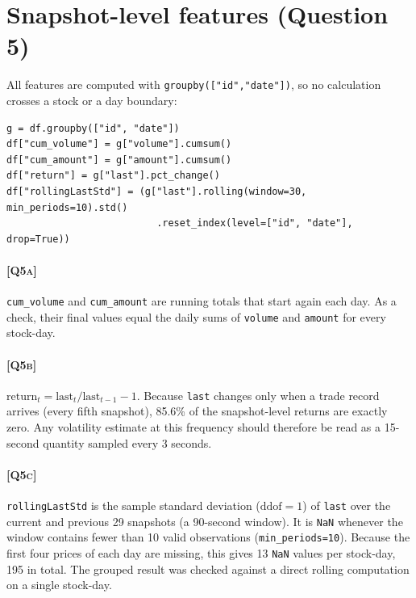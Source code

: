 \documentclass[11pt,a4paper]{article}
\newcommand{\Q}[1]{\textsc{[Q#1]}}
\newcommand{\code}[1]{\texttt{#1}}
\begin{document}
\begin{table}[H]
\centering\small
\caption{\Q{3b} Decomposition of one-sided widenings (\% of all widenings of the stock).}
\label{tab:xor}

\end{table}

\section{Snapshot-level features (Question 5)}\label{sec:features}

All features are computed with \code{groupby(["id","date"])}, so no calculation crosses a stock
or a day boundary:
\begin{lstlisting}
g = df.groupby(["id", "date"])
df["cum_volume"] = g["volume"].cumsum()
df["cum_amount"] = g["amount"].cumsum()
df["return"] = g["last"].pct_change()
df["rollingLastStd"] = (g["last"].rolling(window=30, min_periods=10).std()
                          .reset_index(level=["id", "date"], drop=True))
\end{lstlisting}

\paragraph{\Q{5a}} \code{cum\_volume} and \code{cum\_amount} are running totals that start again
each day. As a check, their final values equal the daily sums of \code{volume} and \code{amount}
for every stock-day.

\paragraph{\Q{5b}} $\text{return}_t = \text{last}_t/\text{last}_{t-1}-1$. Because \code{last}
changes only when a trade record arrives (every fifth snapshot), 85.6\% of the snapshot-level
returns are exactly zero. Any volatility estimate at this frequency should therefore be read as a
15-second quantity sampled every 3 seconds.

\paragraph{\Q{5c}} \code{rollingLastStd} is the sample standard deviation ($\text{ddof}=1$) of
\code{last} over the current and previous 29 snapshots (a 90-second window). It is \code{NaN}
whenever the window contains fewer than 10 valid observations (\code{min\_periods=10}). Because
the first four prices of each day are missing, this gives 13 \code{NaN} values per stock-day, 195 in
total. The grouped result was checked against a direct rolling computation on a single stock-day.
\end{document}
